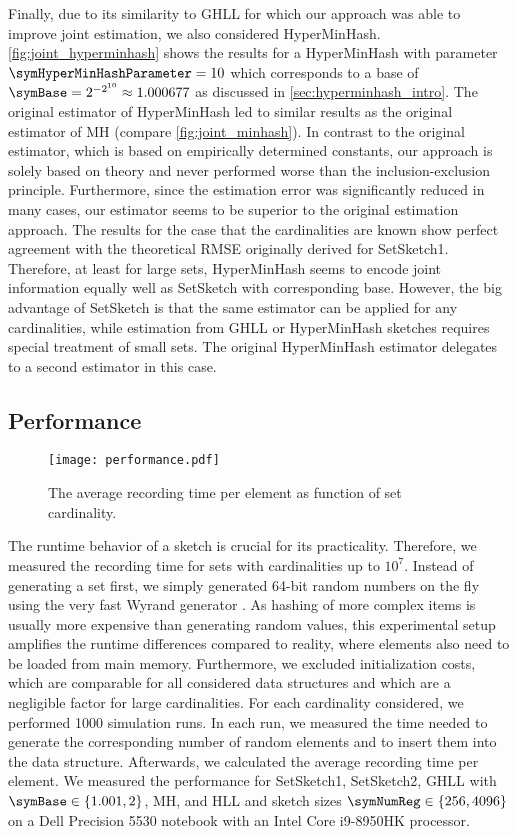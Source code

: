 \documentclass[sigconf, nonacm]{acmart}
\begin{document}
Finally, due to its similarity to \ac{GHLL} for which our approach was able to improve joint estimation, we also considered HyperMinHash. \cref{fig:joint_hyperminhash} shows the results for a HyperMinHash with parameter $\symHyperMinHashParameter=10$ which corresponds to a base of $\symBase=2^{-2^{10}}\approx 1.000677$ as discussed in \cref{sec:hyperminhash_intro}. The original estimator of HyperMinHash led to similar results as the original estimator of \ac{MH} (compare \cref{fig:joint_minhash}). 
In contrast to the original estimator, which is based on empirically determined constants, our approach is solely based on theory and never performed worse than the inclusion-exclusion principle. Furthermore, since the estimation error was significantly reduced in many cases, our estimator seems to be superior to the original estimation approach. 
The results for the case that the cardinalities are known show perfect agreement with the theoretical \ac{RMSE} originally derived for SetSketch1. Therefore, at least for large sets, HyperMinHash seems to encode joint information equally well as SetSketch with corresponding base. However, the big advantage of SetSketch is that the same estimator can be applied for any cardinalities, while estimation from \ac{GHLL} or HyperMinHash sketches requires special treatment of small sets. The original HyperMinHash estimator delegates to a second estimator in this case.

\subsection{Performance}
\begin{figure}
  \centering
  \texttt{[image: performance.pdf]}
  \caption{\boldmath The average recording time per element as function of set cardinality.}
  \label{fig:performance}
\end{figure}
The runtime behavior of a sketch is crucial for its practicality. Therefore, we measured the recording time for sets with cardinalities up to $10^7$. Instead of generating a set first, we simply generated 64-bit random numbers on the fly using the very fast Wyrand generator \cite{Yi2021}. As hashing of more complex items is usually more expensive than generating random values, this experimental setup amplifies the runtime differences compared to reality, where elements also need to be loaded from main memory. Furthermore, we excluded initialization costs, which are comparable for all considered data structures and which are a negligible factor for large cardinalities.
For each cardinality considered, we performed 1000 simulation runs. In each run, we measured the time needed to generate the corresponding number of random elements and to insert them into the data structure. Afterwards, we calculated the average recording time per element. We measured the performance for SetSketch1, SetSketch2, \ac{GHLL} with $\symBase\in\lbrace 1.001, 2 \rbrace$, \ac{MH}, and \ac{HLL} and sketch sizes $\symNumReg\in\lbrace 256,4096\rbrace$ on a Dell Precision 5530 notebook with an Intel Core i9-8950HK processor.
\end{document}
